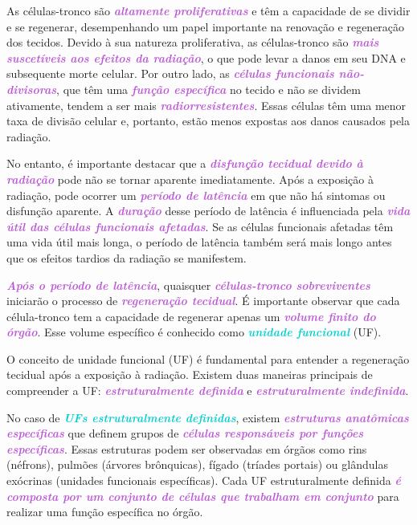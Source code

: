 \documentclass[11pt,a4paper]{article}
\begin{document}
	As células-tronco são \textcolor{MediumOrchid}{\textbf{\textit{altamente proliferativas}}} e têm a capacidade de se dividir e se regenerar, desempenhando um papel importante na renovação e regeneração dos tecidos. Devido à sua natureza proliferativa, as células-tronco são \textcolor{MediumOrchid}{\textbf{\textit{mais suscetíveis aos efeitos da radiação}}}, o que pode levar a danos em seu DNA e subsequente morte celular. Por outro lado, as \textcolor{MediumOrchid}{\textbf{\textit{células funcionais não-divisoras}}}, que têm uma \textcolor{MediumOrchid}{\textbf{\textit{função específica}}} no tecido e não se dividem ativamente, tendem a ser mais \textcolor{MediumOrchid}{\textbf{\textit{radiorresistentes}}}. Essas células têm uma menor taxa de divisão celular e, portanto, estão menos expostas aos danos causados pela radiação.

	No entanto, é importante destacar que a \textcolor{MediumOrchid}{\textbf{\textit{disfunção tecidual devido à radiação}}} pode não se tornar aparente imediatamente. Após a exposição à radiação, pode ocorrer um \textcolor{MediumOrchid}{\textbf{\textit{período de latência}}} em que não há sintomas ou disfunção aparente. A \textcolor{MediumOrchid}{\textbf{\textit{duração}}} desse período de latência é influenciada pela \textcolor{MediumOrchid}{\textbf{\textit{vida útil das células funcionais afetadas}}}. Se as células funcionais afetadas têm uma vida útil mais longa, o período de latência também será mais longo antes que os efeitos tardios da radiação se manifestem.

	\textcolor{MediumOrchid}{\textbf{\textit{Após o período de latência}}}, quaisquer \textcolor{MediumOrchid}{\textbf{\textit{células-tronco sobreviventes}}} iniciarão o processo de \textcolor{MediumOrchid}{\textbf{\textit{regeneração tecidual}}}. É importante observar que cada célula-tronco tem a capacidade de regenerar apenas um \textcolor{MediumOrchid}{\textbf{\textit{volume finito do órgão}}}. Esse volume específico é conhecido como \textcolor{DarkTurquoise}{\textbf{\textit{unidade funcional}}} (UF). 

	O conceito de unidade funcional (UF) é fundamental para entender a regeneração tecidual após a exposição à radiação. Existem duas maneiras principais de compreender a UF: \textcolor{MediumOrchid}{\textbf{\textit{estruturalmente definida}}} e \textcolor{MediumOrchid}{\textbf{\textit{estruturalmente indefinida}}}.

	No caso de \textcolor{DarkTurquoise}{\textbf{\textit{UFs estruturalmente definidas}}}, existem \textcolor{MediumOrchid}{\textbf{\textit{estruturas anatômicas específicas}}} que definem grupos de \textcolor{MediumOrchid}{\textbf{\textit{células responsáveis por funções específicas}}}. Essas estruturas podem ser observadas em órgãos como rins (néfrons), pulmões (árvores brônquicas), fígado (tríades portais) ou glândulas exócrinas (unidades funcionais específicas). Cada UF estruturalmente definida \textcolor{MediumOrchid}{\textbf{\textit{é composta por um conjunto de células que trabalham em conjunto}}} para realizar uma função específica no órgão.
\end{document}
